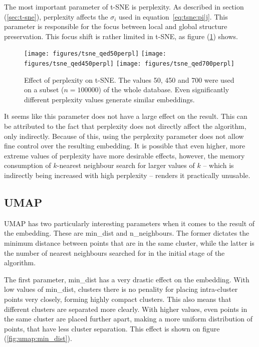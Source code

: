 The most important parameter of t-SNE is perplexity. As described in section (\ref{sec:t-sne}), perplexity affects the $\sigma_i$ used in equation~\eqref{eq:tsne:pi|j}. This parameter is responsible for the focus between local and global structure preservation. This focus shift is rather limited in t-SNE, as figure (\ref{fig:tsne:perplexity}) shows.

\begin{figure}[!h]
	\centering
	\texttt{[image: figures/tsne\_qed50perpl]}
	\texttt{[image: figures/tsne\_qed450perpl]}
	\texttt{[image: figures/tsne\_qed700perpl]}
	\caption{Effect of perplexity on t-SNE. The values 50, 450 and 700 were used on a subset ($n = 100000$) of the whole database. Even significantly different perplexity values generate similar embeddings.}
	\label{fig:tsne:perplexity}
\end{figure}

It seems like this parameter does not have a large effect on the result. This can be attributed to the fact that perplexity does not directly affect the algorithm, only indirectly. Because of this, using the perplexity parameter does not allow fine control over the resulting embedding. It is possible that even higher, more extreme values of perplexity have more desirable effects, however, the memory consumption of $k$-nearest neighbour search for larger values of $k$ -- which is indirectly being increased with high perplexity -- renders it practically unusable.

\subsection{UMAP}


UMAP has two particularly interesting parameters when it comes to the result of the embedding. These are min\_dist and n\_neighbours. The former dictates the minimum distance between points that are in the same cluster, while the latter is the number of nearest neighbours searched for in the initial stage of the algorithm. 

The first parameter, min\_dist has a very drastic effect on the embedding. With low values of min\_dist, clusters there is no penality for placing intra-cluster points very closely, forming  highly compact clusters. This also means that different clusters are separated more clearly. With higher values, even points in the same cluster are placed further apart, making a more uniform distribution of points, that have less cluster separation. This effect is shown on figure (\ref{fig:umap:min_dist}). 

